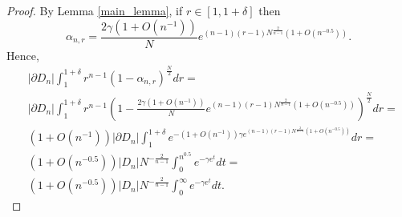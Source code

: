 \documentclass[10pt, twoside, leqno]{article}
\theoremstyle{definition}
\numberwithin{equation}{section}
\newcommand{\NN}{N^{-\frac 2{n-1} }}
\begin{document}
\begin{proof}
By Lemma \ref{main_lemma}, if $r\in [1,1+\delta]$ then
\[
\alpha_{n,r}=\frac{2\gamma\left(1+O\left(n^{-1}\right)\right)}{N}e^{\left(n-1\right)\left(r-1\right)N^{\frac{2}{n-1}}\left(1+O\left(n^{-0.5}\right)\right)}.
\]
Hence,
\begin{equation}
\begin{aligned} & |\partial D_{n}|\int_{1}^{1+\delta}r^{n-1}\left(1-\alpha_{n,r}\right)^{\frac{N}{2}}dr=\\
& |\partial D_{n}|\int_{1}^{1+\delta}r^{n-1}\left(1-\frac{2\gamma\left(1+O\left(n^{-1}\right)\right)}{N}e^{\left(n-1\right)\left(r-1\right)N^{\frac{2}{n-1}}\left(1+O\left(n^{-0.5}\right)\right)}\right)^{\frac{N}{2}}dr=\\
& (1+O(n^{-1}))|\partial D_{n}|\int_{1}^{1+\delta}e^{-\left(1+O\left(n^{-1}\right)\right)\gamma e^{\left(n-1\right)\left(r-1\right)N^{\frac{2}{n-1}}\left(1+O\left(n^{-0.5}\right)\right)}}dr=\\
& \left(1+O\left(n^{-0.5}\right)\right)|D_{n}|\NN\int_{0}^{n^{0.5}}e^{-\gamma e^{t}}dt=\\
& \left(1+O\left(n^{-0.5}\right)\right)|D_{n}|\NN\int_{0}^{\infty}e^{-\gamma e^{t}}dt.
\end{aligned}
\end{equation}
\end{proof}
\end{document}
